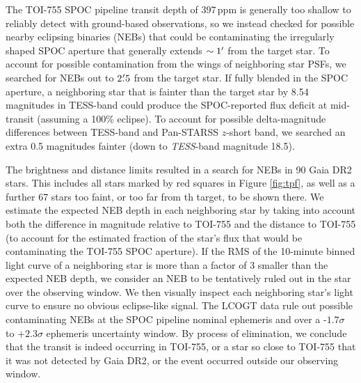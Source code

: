 \documentclass[fleqn,usenatbib]{mnras}
\begin{document}
The TOI-755 SPOC pipeline transit depth of 397\,ppm is generally too shallow to reliably detect with ground-based observations, so we instead checked for possible nearby eclipsing binaries (NEBs) that could be contaminating the irregularly shaped SPOC aperture that generally extends $\sim1\hbox{$^\prime$}$ from the target star.
To account for possible contamination from the wings of neighboring star PSFs, we searched for NEBs out to $2\hbox{$.\mkern-4mu^\prime$}5$ from the target star.
If fully blended in the SPOC aperture, a neighboring star that is fainter than the target star by 8.54 magnitudes in TESS-band could produce the SPOC-reported flux deficit at mid-transit (assuming a 100\% eclipse).
To account for possible delta-magnitude differences between TESS-band and Pan-STARSS $z$-short band, we searched an extra 0.5 magnitudes fainter (down to \textit{TESS}-band magnitude 18.5). 

The brightness and distance limits resulted in a search for NEBs in 90 Gaia DR2 stars. 
This includes all stars marked by red squares in Figure \ref{fig:tpf}, as well as a further 67 stars too faint, or too far from th target, to be shown there.
We estimate the expected NEB depth in each neighboring star by taking into account both the difference in magnitude relative to TOI-755 and the distance to TOI-755 (to account for the estimated fraction of the star's flux that would be contaminating the TOI-755 SPOC aperture).
If the RMS of the 10-minute binned light curve of a neighboring star is more than a factor of 3 smaller than the expected NEB depth, we consider an NEB to be tentatively ruled out in the star over the observing window.
We then visually inspect each neighboring star's light curve to ensure no obvious eclipse-like signal.
The LCOGT data rule out possible contaminating NEBs at the SPOC pipeline nominal ephemeris and over a -$1.7\sigma$ to +$2.3\sigma$ ephemeris uncertainty window.
By process of elimination, we conclude that the transit is indeed occurring in TOI-755, or a star so close to TOI-755 that it was not detected by Gaia DR2, or the event occurred outside our observing window.
\end{document}
